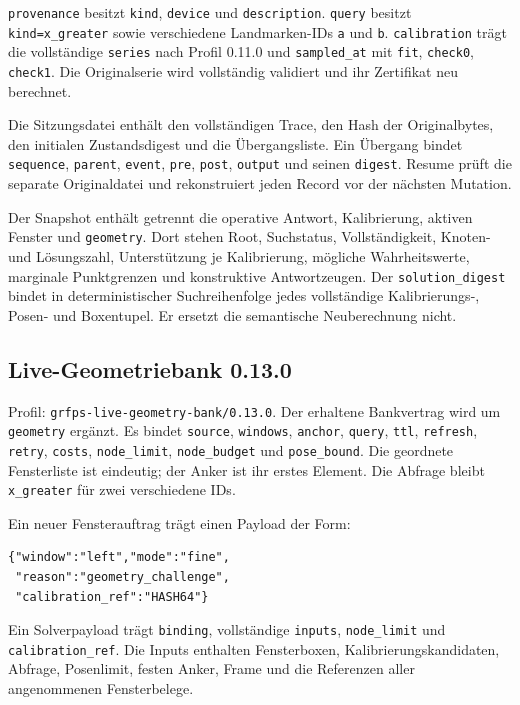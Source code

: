 \documentclass[11pt,a4paper]{article}
\begin{document}
\texttt{provenance} besitzt \texttt{kind}, \texttt{device} und
\texttt{description}. \texttt{query} besitzt \texttt{kind=x\_greater}
sowie verschiedene Landmarken-IDs \texttt{a} und \texttt{b}.
\texttt{calibration} trägt die vollständige \texttt{series} nach
Profil 0.11.0 und \texttt{sampled\_at} mit \texttt{fit},
\texttt{check0}, \texttt{check1}. Die Originalserie wird vollständig
validiert und ihr Zertifikat neu berechnet.

Die Sitzungsdatei enthält den vollständigen Trace, den Hash der
Originalbytes, den initialen Zustandsdigest und die Übergangsliste.
Ein Übergang bindet \texttt{sequence}, \texttt{parent},
\texttt{event}, \texttt{pre}, \texttt{post}, \texttt{output} und
seinen \texttt{digest}. Resume prüft die separate Originaldatei
und rekonstruiert jeden Record vor der nächsten Mutation.

Der Snapshot enthält getrennt die operative Antwort,
Kalibrierung, aktiven Fenster und \texttt{geometry}. Dort stehen
Root, Suchstatus, Vollständigkeit, Knoten- und Lösungszahl,
Unterstützung je Kalibrierung, mögliche Wahrheitswerte, marginale
Punktgrenzen und konstruktive Antwortzeugen. Der
\texttt{solution\_digest} bindet in deterministischer Suchreihenfolge
jedes vollständige Kalibrierungs-, Posen- und Boxentupel. Er ersetzt
die semantische Neuberechnung nicht.

\clearpage\subsection{Live-Geometriebank 0.13.0}
Profil: \texttt{grfps-live-geometry-bank/0.13.0}. Der erhaltene
Bankvertrag wird um \texttt{geometry} ergänzt. Es bindet
\texttt{source}, \texttt{windows}, \texttt{anchor}, \texttt{query},
\texttt{ttl}, \texttt{refresh}, \texttt{retry}, \texttt{costs},
\texttt{node\_limit}, \texttt{node\_budget} und \texttt{pose\_bound}.
Die geordnete Fensterliste ist eindeutig; der Anker ist ihr erstes
Element. Die Abfrage bleibt \texttt{x\_greater} für zwei verschiedene IDs.

Ein neuer Fensterauftrag trägt einen Payload der Form:
\begin{lstlisting}
{"window":"left","mode":"fine",
 "reason":"geometry_challenge",
 "calibration_ref":"HASH64"}
\end{lstlisting}
Ein Solverpayload trägt \texttt{binding}, vollständige
\texttt{inputs}, \texttt{node\_limit} und
\texttt{calibration\_ref}. Die Inputs enthalten Fensterboxen,
Kalibrierungskandidaten, Abfrage, Posenlimit, festen Anker,
Frame und die Referenzen aller angenommenen Fensterbelege.
\end{document}

